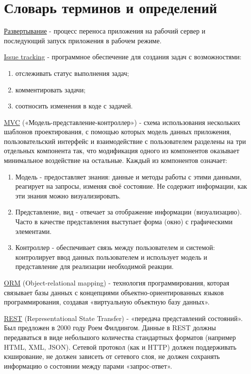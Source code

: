 \section*{Словарь терминов и определений}
\underline{Развертывание} - процесс переноса приложения на рабочий сервер и
последующий запуск приложения в рабочем режиме.

\underline{Issue tracking} - программное обеспечение для создания задач с
возможностями:
\begin{enumerate}
  \item отслеживать статус выполнения задач;
  \item комментировать задачи;
  \item соотносить изменения в коде с задачей.
\end{enumerate}

\underline{MVC} («Модель-представление-контроллер») - схема использования
нескольких шаблонов проектирования, с помощью которых модель данных приложения,
пользовательский интерфейс и взаимодействие с пользователем разделены на три
отдельных компонента так, что модификация одного из компонентов оказывает
минимальное воздействие на остальные.  Каждый из компонентов означает:
\begin{enumerate}
  \item Модель - предоставляет знания: данные и методы работы с этими данными, реагирует на запросы, изменяя своё состояние. Не содержит информации, как эти знания можно визуализировать.
  \item Представление, вид - отвечает за отображение информации (визуализацию).
Часто в качестве представления выступает форма (окно) с графическими элементами.
  \item Контроллер - обеспечивает связь между пользователем и системой:
контролирует ввод данных пользователем и использует модель и представление для реализации необходимой реакции.   
\end{enumerate}

\underline{ORM} (Object-relational mapping) - технология программирования,
которая связывает базы данных с концепциями объектно-ориентированных языков
программирования, создавая «виртуальную объектную базу данных».

\underline{REST} (Representational State Transfer) - «передача представлений
состояний».
Был предложен в 2000 году Роем Филдингом. Данные в REST должны передаваться в
виде небольшого количества стандартных форматов (например HTML, XML, JSON).
Сетевой протокол (как и HTTP) должен поддерживать кэширование, не должен
зависеть от сетевого слоя, не должен сохранять информацию о состоянии между
парами «запрос-ответ».


